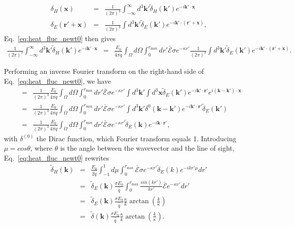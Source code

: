 \documentclass[twocolumns]{emulateapj}
\begin{document}
\begin{eqnarray}
  \label{eq:FT_delta}
  \delta_H(\mathbf{x})&=&\frac{1}{(2\pi)^3}\int_{-\infty}^{\infty} d^3\mathbf{k'} \tilde{\delta}_H(\mathbf{k'}) e^{-i\mathbf{k'}\cdot\mathbf{x}}\\ \nonumber
  \delta_E(\mathbf{r}'+\mathbf{x})&=&\frac{1}{(2\pi)^3}\int d^3\mathbf{k'} \tilde{\delta}_E(\mathbf{k'}) e^{-i\mathbf{k'}\cdot(\mathbf{r'}+\mathbf{x})},
\end{eqnarray}
Eq.~\eqref{eq:heat_fluc_newt0} then gives
\begin{eqnarray}
  \label{eq:heat_fluc_newt1}
\frac{1}{(2\pi)^3}\int_{-\infty}^{\infty} d^3\mathbf{k'} \tilde{\delta}_H(\mathbf{k'}) e^{-i\mathbf{k'}\cdot\mathbf{x}}&=&\frac{E_0}{4\pi\bar{\dot{q}}} \int_{\Omega}d\Omega\int_0^{r_{\mathrm{max}}}  dr' \bar{\mathcal{E}}\sigma  e^{-\kappa r'}  \frac{1}{(2\pi)^3}\int d^3\mathbf{k'} \tilde{\delta}_E(\mathbf{k'}) e^{-i\mathbf{k'}\cdot(\mathbf{r'}+\mathbf{x})}.
\end{eqnarray}

Performing an inverse Fourier transform on the right-hand side of Eq.~\eqref{eq:heat_fluc_newt0}, we have
\begin{eqnarray}
  \label{eq:right}
  &=& \frac{1}{(2\pi)^3} \frac{E_0}{4\pi\bar{\dot{q}}}\int_{\Omega}d\Omega\int_0^{r_{\mathrm{max}}} dr'\bar{ \mathcal{E}}\sigma  e^{-\kappa r'} \int d^3\mathbf{k'}\int d^3\mathbf{x} \tilde{\delta}_E(\mathbf{k'})e^{-i\mathbf{k'}\cdot{\mathbf{r}'}} e^{i(\mathbf{k}-\mathbf{k'})\cdot\mathbf{x}} \\ \nonumber
  &=&\frac{1}{(2\pi)^3} \frac{E_0}{4\pi\bar{\dot{q}}} \int_{\Omega}d\Omega\int_0^{r_{\mathrm{max}}}   dr' \bar{\mathcal{E}}\sigma  e^{-\kappa r'} \int d^3\mathbf{k'} \delta^{0}(\mathbf{k}-\mathbf{k}')e^{-i\mathbf{k'}\cdot{\mathbf{r}'}} \tilde{\delta}_E(\mathbf{k'})    \\ \nonumber
  &=&\frac{1}{(2\pi)^3} \frac{E_0}{4\pi\bar{\dot{q}}} \int_{\Omega}d\Omega\int_0^{r_{\mathrm{max}}}  dr' \bar{ \mathcal{E}}\sigma  e^{-\kappa r'}  \tilde{\delta}_E(\mathbf{k}) e^{-i\mathbf{k}\cdot{\mathbf{r}'}}  ,
\end{eqnarray}
with $\delta^{(0)}$ the Dirac function, which Fourier transform equals 1. Introducing $\mu=cos\theta$, where $\theta$ is the angle between the wavevector and the line of sight, Eq.~\eqref{eq:heat_fluc_newt0} rewrites
\begin{eqnarray}
  \label{eq:heat_fluc_newt1}
  \tilde{\delta}_H(\mathbf{k})&=&  \frac{E_0}{\bar{2\dot{q}}} \int_{-1}^{1} d\mu \int_0^{r_{\mathrm{max}}}  \bar{\mathcal{E}}\sigma  e^{-\kappa r'}  \tilde{\delta}_E(k) e^{-ikr'\mu}  dr'\\ \nonumber
&=&\tilde{\delta}_E(\mathbf{k})\frac{\sigma E_0}{\bar{\dot{q}}}\int_0^{r_{\mathrm{max}}} \frac{sin(kr')}{kr'}   \bar{\mathcal{E}}  e^{-\kappa r'}   dr'\\ \nonumber
&=&\tilde{\delta}_E(\mathbf{k})\frac{\sigma E_0}{ \bar{\dot{q}}}\frac{\kappa}{k}  \arctan\left(\frac{k}{\kappa}\right)\\ \nonumber
&=&\tilde{\delta}(\mathbf{k})\frac{\sigma E_0}{ \bar{\dot{q}}}\frac{\kappa}{k}  \arctan\left(\frac{k}{\kappa}\right).\\ 
\end{eqnarray}
\end{document}
